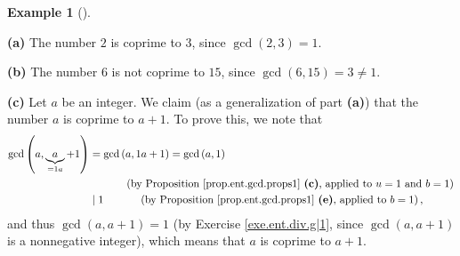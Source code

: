 \documentclass[numbers=enddot,12pt,final,onecolumn,notitlepage]{scrartcl}%
\numberwithin{exer}{subsection}
\theoremstyle{definition}
\newtheorem{exam}[theo]{Example}
\newenvironment{example}[1][]
{\begin{exam}[#1]\begin{leftbar}}
{\end{leftbar}\end{exam}}
\begin{document}
\begin{example}
\label{exa.ent.coprime.1}\textbf{(a)} The number $2$ is coprime to $3$, since
$\gcd\left(  2,3\right)  =1$.

\textbf{(b)} The number $6$ is not coprime to $15$, since $\gcd\left(
6,15\right)  =3\neq1$.

\textbf{(c)} Let $a$ be an integer. We claim (as a generalization of part
\textbf{(a)}) that the number $a$ is coprime to $a+1$. To prove this, we note
that%
\begin{align*}
\gcd\left(  a,\underbrace{a}_{=1a}+1\right)   &  =\gcd\left(  a,1a+1\right)
=\gcd\left(  a,1\right)  \\
&  \ \ \ \ \ \ \ \ \ \ \left(  \text{by Proposition \ref{prop.ent.gcd.props1}
\textbf{(c)}, applied to }u=1\text{ and }b=1\right)  \\
&  \mid1\ \ \ \ \ \ \ \ \ \ \left(  \text{by Proposition
\ref{prop.ent.gcd.props1} \textbf{(e)}, applied to }b=1\right)  ,
\end{align*}
and thus $\gcd\left(  a,a+1\right)  =1$ (by Exercise \ref{exe.ent.div.g|1},
since $\gcd\left(  a,a+1\right)  $ is a nonnegative integer), which means that
$a$ is coprime to $a+1$.


\end{example}
\end{document}
